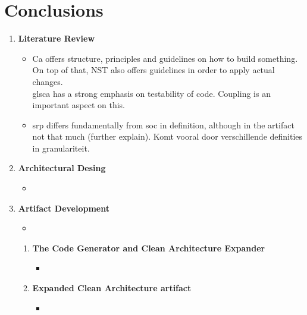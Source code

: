 \chapter{Conclusions} \label{chap_conclusions}

\begin{enumerate}
    \color{red}

    \item \textbf{Literature Review}
    \begin{itemize}
        \item Ca offers structure, principles and guidelines on how to build something. On top
        of that, NST also offers guidelines in order to apply actual changes.
        \\gls{ca} has a strong emphasis on testability of code. Coupling is an important
        aspect on this.
        \item \gls{srp} differs fundamentally from \gls{soc} in definition, although in
        the artifact not that much (further explain). Komt vooral door verschillende
        definities in granulariteit.
    \end{itemize}
    
    \item \textbf{Architectural Desing}
    \begin{itemize}
        \item 
    \end{itemize}

    \item \textbf{Artifact Development}
    \begin{itemize}
        \item 
    \end{itemize}
    \begin{enumerate}[label*={\arabic*.}]
        
        \item \textbf{The Code Generator and Clean Architecture Expander}
        \begin{itemize}
            \item 
        \end{itemize}
        
        \item \textbf{Expanded Clean Architecture artifact}
        \begin{itemize}
            \item 
        \end{itemize}
        
    \end{enumerate}
    

\end{enumerate}
